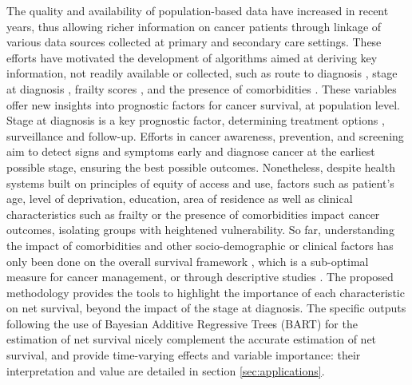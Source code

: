 \documentclass[12pt]{article}
\begin{document}
The quality and availability of population-based data have increased in recent years, thus allowing richer information on cancer patients through linkage of various data sources collected at primary and secondary care settings. These efforts have motivated the development of algorithms aimed at deriving key information, not readily available or collected, such as route to diagnosis \citep{elliss:2012}, stage at diagnosis \citep{benitez:2016}, frailty scores \citep{gilbert:2018}, and the presence of comorbidities \citep{maringe:2017}. These variables offer new insights into prognostic factors for cancer survival, at population level. Stage at diagnosis is a key prognostic factor, determining treatment options \citep{nice2020colorectal}, surveillance and follow-up. Efforts in cancer awareness, prevention, and screening aim to detect signs and symptoms early and diagnose cancer at the earliest possible stage, ensuring the best possible outcomes. Nonetheless, despite health systems built on principles of equity of access and use, factors such as patient's age, level of deprivation, education, area of residence as well as clinical characteristics such as frailty or the presence of comorbidities impact cancer outcomes, isolating groups with heightened vulnerability. So far, understanding the impact of comorbidities and other socio-demographic or clinical factors has only been done on the overall survival framework \citep{rubio:2022}, which is a sub-optimal measure for cancer management, or through descriptive studies \citep{michalopoulou:2021}. The proposed methodology provides the tools to highlight the importance of each characteristic on net survival, beyond the impact of the stage at diagnosis. The specific outputs following the use of Bayesian Additive Regressive Trees (BART) for the estimation of net survival nicely complement the accurate estimation of net survival, and provide time-varying effects and variable importance: their interpretation and value are detailed in section \ref{sec:applications}. 


\end{document}

